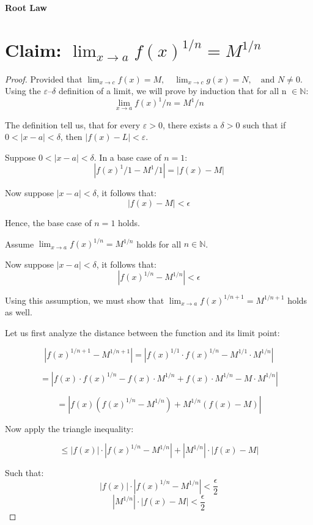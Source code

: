\documentclass{article}
\begin{document}
	
	\textbf{Root Law}
	
	\section*{Claim: $\lim_{x \to a} f(x)^{1/n} = M^{1/n}$}

	
	\begin{proof}
		
		Provided that $\lim_{x \to c} f(x) = M, \quad \lim_{x \to c} g(x) = N, \quad \text{and } N \neq 0.$ Using the $\varepsilon$–$\delta$ definition of a limit, we will prove by induction that for all n $\in \mathbb{N}$:
		\[
		\lim_{x \to a} f(x)^1/n = M^1/n
		\]
		
		The definition tell us, that for every $\varepsilon > 0$, there exists a $\delta > 0$ such that if $0 < |x - a| < \delta$, then $|f(x) - L| < \varepsilon$.
		
		
		Suppose $0 < |x - a| < \delta$. In a base case of $n = 1$:
		\[
		|f(x)^1/1 - M^1/1| = |f(x) - M|
		\]
		
		Now suppose $|x - a| < \delta$, it follows that:
		\[
		|f(x) - M| < \epsilon
		\]
		
		Hence, the base case of $n = 1$ holds.
		
		\vspace{1cm}
		
		Assume $\lim_{x \to a} f(x)^{1/n} = M^{1/n}$ holds for all $n \in \mathbb{N}$.
		
		Now suppose $|x - a| < \delta$, it follows that:
		\[
		|f(x)^{1/n} - M^{1/n}| < \epsilon
		\]
		
		Using this assumption, we must show that $\lim_{x \to a} f(x)^{1/n+1} = M^{1/n+1}$ holds as well.
		
		Let us first analyze the distance between the function and its limit point:
		
		\[
		|f(x)^{1/n+1} - M^{1/n+1}| 
		= |f(x)^{1/1} \cdot f(x)^{1/n} - M^{1/1} \cdot M^{1/n}|
		\]
		
		\[
		= |f(x) \cdot f(x)^{1/n} - f(x) \cdot M^{1/n} + f(x) \cdot M^{1/n} - M \cdot M^{1/n}|
		\]
		
		\[
		= |f(x)(f(x)^{1/n} - M^{1/n}) + M^{1/n}(f(x) - M)|
		\]
		
		Now apply the triangle inequality:
		
		\[
		\leq |f(x)| \cdot |f(x)^{1/n} - M^{1/n}| + |M^{1/n}| \cdot |f(x) - M|
		\]
		
		Such that:
		\[
		|f(x)| \cdot |f(x)^{1/n} - M^{1/n}| < \frac{\epsilon}{2}
		\]
		\[
		|M^{1/n}| \cdot |f(x) - M| < \frac{\epsilon}{2}
		\]
		

\end{proof}
\end{document}

